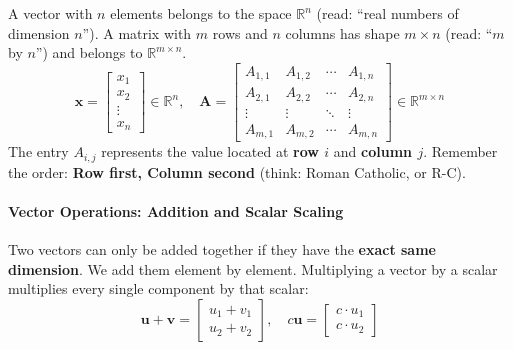 A vector with $n$ elements belongs to the space $\mathbb{R}^n$ (read: ``real numbers of dimension $n$''). A matrix with $m$ rows and $n$ columns has shape $m \times n$ (read: ``$m$ by $n$'') and belongs to $\mathbb{R}^{m \times n}$.
\begin{equation}
\mathbf{x} = \begin{bmatrix} x_1 \\ x_2 \\ \vdots \\ x_n \end{bmatrix} \in \mathbb{R}^n, \quad
\mathbf{A} = \begin{bmatrix} 
A_{1,1} & A_{1,2} & \cdots & A_{1,n} \\ 
A_{2,1} & A_{2,2} & \cdots & A_{2,n} \\ 
\vdots & \vdots & \ddots & \vdots \\ 
A_{m,1} & A_{m,2} & \cdots & A_{m,n} 
\end{bmatrix} \in \mathbb{R}^{m \times n}
\end{equation}
The entry $A_{i,j}$ represents the value located at \textbf{row $i$} and \textbf{column $j$}. Remember the order: \textbf{Row first, Column second} (think: Roman Catholic, or R-C).

\paragraph{Vector Operations: Addition and Scalar Scaling}
Two vectors can only be added together if they have the \textbf{exact same dimension}. We add them element by element.
Multiplying a vector by a scalar multiplies every single component by that scalar:
\begin{equation}
\mathbf{u} + \mathbf{v} = \begin{bmatrix} u_1 + v_1 \\ u_2 + v_2 \end{bmatrix}, \quad
c \mathbf{u} = \begin{bmatrix} c \cdot u_1 \\ c \cdot u_2 \end{bmatrix}\label{eq:vec_add_scale}
\end{equation}

